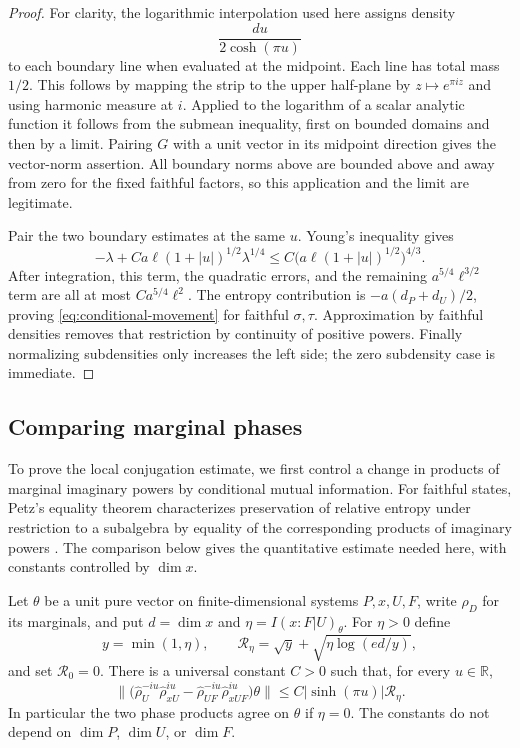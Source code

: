 \begin{proof}
For clarity, the logarithmic interpolation used here assigns density
\[
 \frac{du}{2\cosh(\pi u)}
\]
to each boundary line when evaluated at the midpoint.  Each line
has total mass $1/2$.  This follows by mapping the strip to the
upper half-plane by $z\mapsto e^{\pi iz}$ and using harmonic
measure at $i$.  Applied to the logarithm of a scalar analytic
function it follows from the submean inequality, first on bounded
domains and then by a limit.  Pairing $G$ with a unit vector in its
midpoint direction gives the vector-norm assertion.  All boundary
norms above are bounded above and away from zero for the fixed
faithful factors, so this application and the limit are legitimate.

Pair the two boundary estimates at the same $u$.  Young's inequality
gives
\[
 -\lambda+C a\ell(1+|u|)^{1/2}\lambda^{1/4}
 \le C\big(a\ell(1+|u|)^{1/2}\big)^{4/3}.
\]
After integration, this term, the quadratic errors, and the remaining
$a^{5/4}\ell^{3/2}$ term are all at most $C a^{5/4}\ell^2$.
The entropy contribution is $-a(d_P+d_U)/2$, proving
\eqref{eq:conditional-movement} for faithful $\sigma,\tau$.
Approximation by faithful densities removes that restriction by
continuity of positive powers.  Finally normalizing subdensities
only increases the left side; the zero subdensity case is immediate.
\end{proof}

\subsection{Comparing marginal phases}

To prove the local conjugation estimate, we first control a change in
products of marginal imaginary powers by conditional mutual information.
For faithful states, Petz's equality theorem characterizes preservation
of relative entropy under restriction to a subalgebra by equality of the
corresponding products of imaginary powers
\cite[Theorem~4(iii),(iv)]{Petz1986}.
The comparison below gives the quantitative estimate needed here, with
constants controlled by $\dim x$.

\begin{lemma}\label{lem:conditional-phases}
Let $\theta$ be a unit pure vector on finite-dimensional systems
$P,x,U,F$, write $\rho_D$ for its marginals, and put
$d=\dim x$ and $\eta=I(x:F|U)_\theta$.  For $\eta>0$ define
\[
 y=\min(1,\eta),\qquad
 \mathcal R_\eta=\sqrt y+\sqrt{\eta\log(ed/y)},
\]
and set $\mathcal R_0=0$.  There is a universal constant $C>0$ such
that, for every $u\in\mathbb R$,
\begin{equation}\label{eq:conditional-modular-bound}
 \big\|\big(\widehat\rho_U^{-iu}\widehat\rho_{xU}^{iu}
       -\widehat\rho_{UF}^{-iu}\widehat\rho_{xUF}^{iu}\big)
                                            \theta\big\|
 \le C|\sinh(\pi u)|\mathcal R_\eta.
\end{equation}
In particular the two phase products agree on $\theta$ if $\eta=0$.
The constants do not depend on $\dim P$, $\dim U$, or $\dim F$.
\end{lemma}

